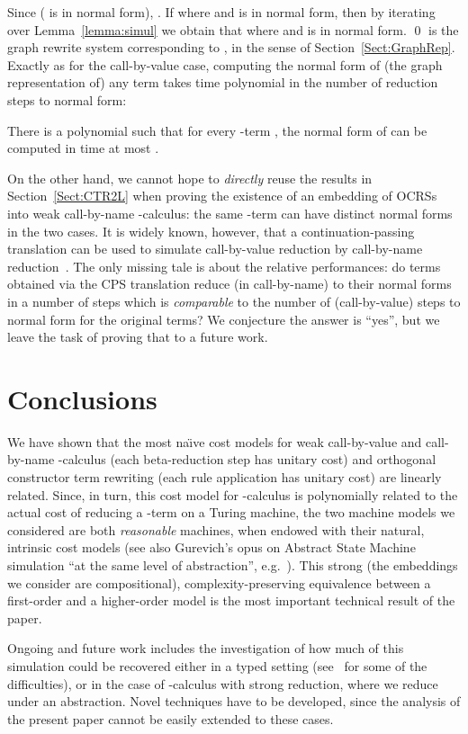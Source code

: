 \documentclass{LMCS}
\newcounter{number}
\begin{document}
Since  ( is in normal form), .
If  where
 and  is in normal form, then
by iterating over Lemma~\ref{lemma:simul} we obtain that 
where  and  is in normal form.
\qed
 is the graph rewrite system corresponding to , in the sense of
Section~\ref{Sect:GraphRep}. Exactly as for the call-by-value case, computing the normal
form of (the graph representation of) any term takes time polynomial in the
number of reduction steps to normal form:
\begin{thm}\label{thm:mainw}
There is a polynomial  such that for every -term ,
the normal form of  can be computed in time at most 
.
\end{thm}
On the other hand, we cannot hope to \emph{directly} reuse the results in Section~\ref{Sect:CTR2L}
when proving the existence of an embedding of OCRSs into weak call-by-name 
-calculus: the same -term can have distinct normal forms in the two cases. 
It is widely known, however, that a continuation-passing translation
can be used to simulate call-by-value reduction by call-by-name reduction~\cite{Plotkin75tcs}.
The only missing tale is about the relative performances: do terms obtained via the CPS 
translation reduce (in call-by-name) to their normal forms in a number of
steps which is \emph{comparable} to the number of (call-by-value) steps to normal form
for the original terms? We conjecture the answer is ``yes'', but we leave the task of proving that
to a future work.
\section{Conclusions}
We have shown that the most na\"\i{}ve cost models for weak call-by-value 
and call-by-name
-calculus
(each beta-reduction step has unitary cost)
and orthogonal constructor term rewriting (each rule application has unitary cost)
are linearly related. Since, in turn, this cost model for
-calculus is polynomially related to the actual cost of reducing
a -term on a Turing machine, 
the two machine models we considered are both \emph{reasonable} machines, when
endowed with their natural, intrinsic cost models (see also Gurevich's opus on Abstract State Machine
simulation ``at the same level of abstraction'', e.g.~\cite{Gurevich}).
This strong (the embeddings we consider are compositional), complexity-preserving
equivalence between a first-order and a higher-order model is the most important technical
result of the paper. 

Ongoing and future work includes the investigation of how much of this simulation could be
recovered either in a typed setting (see~\cite{SplawskiU99} for some of the difficulties),
or in the case of -calculus with strong reduction, where we reduce under an abstraction. 
Novel techniques have to be developed, since the analysis of the present 
paper cannot be easily extended to these cases.



\end{document}
